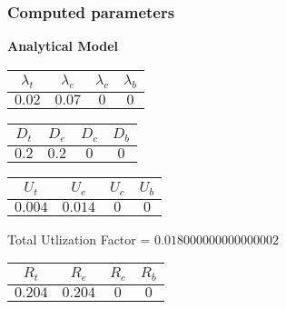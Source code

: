\documentclass{article}
\begin{document}
\subsubsection{Computed parameters}
\begin{minipage}{0.5\textwidth}
\centering	\textbf{Analytical Model}
\begin{table}[H]
\centering
\begin{tabular}{@{}cccc@{}}
\toprule
$\lambda_t$ & $\lambda_e$ & $\lambda_c$ & $\lambda_b$\\
\midrule
$0.02$ & $0.07$ & $0$ & $0$\\
\bottomrule
\end{tabular}
\end{table}\begin{table}[H]
\centering
\begin{tabular}{@{}cccc@{}}
\toprule
$D_t$ & $D_e$ & $D_c$ & $D_b$\\
\midrule
$0.2$ & $0.2$ & $0$ & $0$\\
\bottomrule
\end{tabular}
\end{table}\begin{table}[H]
\centering
\begin{tabular}{@{}cccc@{}}
\toprule
$U_t$ & $U_e$ & $U_c$ & $U_b$\\
\midrule
$0.004$ & $0.014$ & $0$ & $0$\\
\bottomrule
\end{tabular}
\end{table}
\centering Total Utlization Factor = $0.018000000000000002$
\begin{table}[H]
\centering
\begin{tabular}{@{}cccc@{}}
\toprule
$R_t$ & $R_e$ & $R_c$ & $R_b$\\
\midrule
$0.204$ & $0.204$ & $0$ & $0$\\
\bottomrule
\end{tabular}
\end{table}
\end{minipage}
\end{document}
